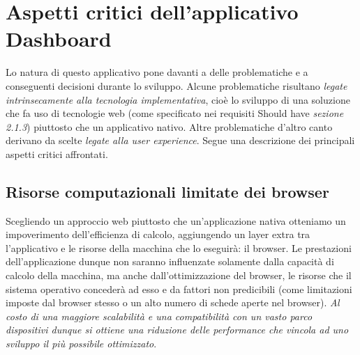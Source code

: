 \section{Aspetti critici dell'applicativo Dashboard}
Lo natura di questo applicativo pone davanti a delle problematiche e a conseguenti decisioni durante lo sviluppo.\newline
Alcune problematiche risultano \emph{legate intrinsecamente alla tecnologia implementativa}, cioè lo sviluppo di una soluzione che fa uso di tecnologie web (come specificato nei requisiti Should have \emph{sezione 2.1.3}) piuttosto che un applicativo nativo.\newline
Altre problematiche d'altro canto derivano da scelte \emph{legate alla user experience}.\newline
Segue una descrizione dei principali aspetti critici affrontati.
\subsection{Risorse computazionali limitate dei browser}
Scegliendo un approccio web piuttosto che un'applicazione nativa otteniamo un impoverimento dell'efficienza di calcolo, aggiungendo un layer extra tra l'applicativo e le risorse della macchina che lo eseguirà: il browser.\newline
Le prestazioni dell'applicazione dunque non saranno influenzate solamente dalla capacità di calcolo della macchina, ma anche dall'ottimizzazione del browser, le risorse che il sistema operativo concederà ad esso e da fattori non predicibili (come limitazioni imposte dal browser stesso o un alto numero di schede aperte nel browser).\newline
\emph{Al costo di una maggiore scalabilità e una compatibilità con un vasto parco dispositivi dunque si ottiene una riduzione delle performance che vincola ad uno sviluppo il più possibile ottimizzato}.
